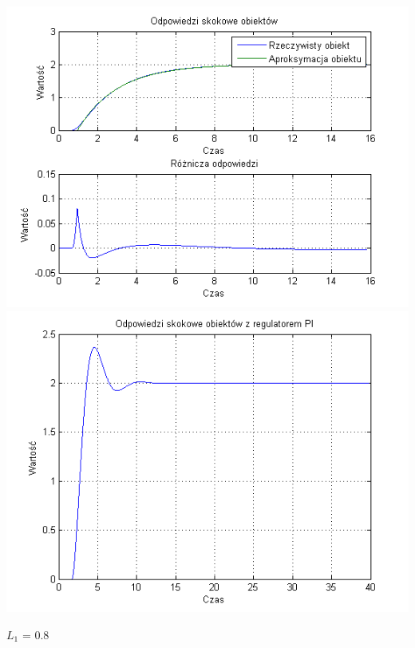 \documentclass[10pt,a4paper]{article}
\begin{document}
\begin{center}
\includegraphics[scale=1]{images/jeden/skrypt_183.png}\\
\includegraphics[scale=1]{images/jeden/skrypt_184.png}\\
\end{center}
\newpage
$L_1$ = 0.8
\end{document}
